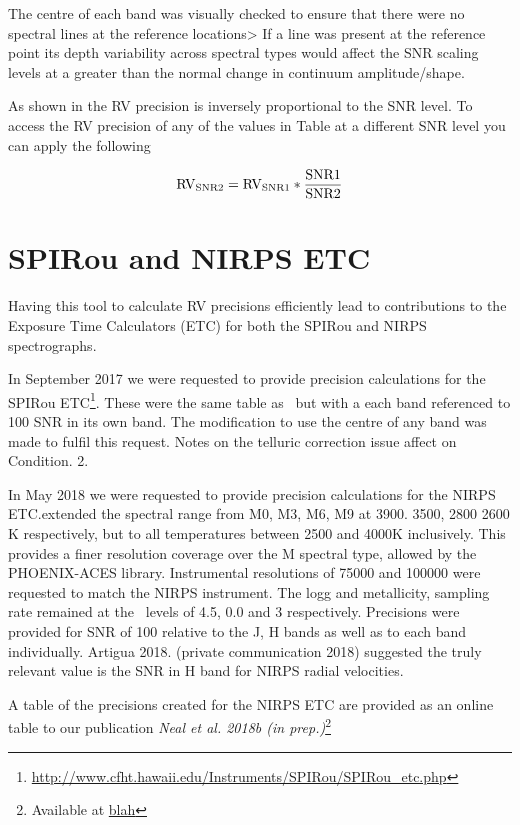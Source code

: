 The centre of each band was visually checked to ensure that there were no spectral lines at the reference locations> If a line was present at the reference point its depth variability across spectral types would affect the SNR scaling levels at a greater than the normal change in continuum amplitude/shape.

As shown in  the RV precision is inversely proportional to the SNR level. To access the RV precision of any of the values in Table at a different SNR level you can apply the following

\begin{equation}
\rm RV_{SNR2} = RV_{SNR1} * \frac{SNR1}{SNR2}
\end{equation}


\section{SPIRou and NIRPS ETC}\label{sec:spirou_nirps_etc}
Having this tool to calculate RV precisions efficiently lead to contributions to the Exposure Time Calculators (ETC) for both the SPIRou and NIRPS spectrographs.

In September 2017 we were requested to provide precision calculations for the SPIRou ETC\footnote{\url{http://www.cfht.hawaii.edu/Instruments/SPIRou/SPIRou_etc.php}}. These were the same table as~\citet{figueira_radial_2016} but with a each band referenced to 100 SNR in its own band. The modification to use the centre of any band was made to fulfil this request. Notes on the telluric correction issue affect on Condition. 2.

In May 2018 we were requested to provide precision calculations for the NIRPS ETC.\@This extended the spectral range from M0, M3, M6, M9 at 3900. 3500, 2800 2600 K respectively, but to all temperatures between 2500 and 4000K inclusively. This provides a finer resolution coverage over the M spectral type, allowed by the PHOENIX-ACES library.
Instrumental resolutions of 75000 and 100000 were requested to match the NIRPS instrument.
The logg and metallicity, sampling rate remained at the~\citet{figueira_radial_2016} levels of 4.5, 0.0 and 3 respectively.
Precisions were provided for SNR of 100 relative to the J, H bands as well as to each band individually. Artigua 2018. (private communication 2018) suggested the truly relevant value is the SNR in H band for NIRPS radial velocities.

A table of the precisions created for the NIRPS ETC are provided as an online table to our publication \textit{Neal et al. 2018b (in prep.)}\footnote{Available at \href{blah}{blah}} 


